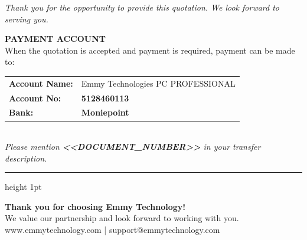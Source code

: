 \documentclass[11pt, a4paper]{article}
\begin{document}
\vspace{6mm}

\begin{flushright}
    \begin{minipage}{0.65\textwidth}
        \raggedleft
        \small
        \textit{Thank you for the opportunity to provide this quotation. We look forward to serving you.}
    \end{minipage}
\end{flushright}

\vspace{4mm}

\noindent
\begin{minipage}[t]{0.65\textwidth}
    \textbf{\textcolor{brandblue}{PAYMENT ACCOUNT}} \\
    \vspace{1mm}
    \small When the quotation is accepted and payment is required, payment can be made to: \\
    \vspace{1mm}
    \begin{tabular}{|l l|}
        \hline
        \textbf{Account Name:} & Emmy Technologies PC PROFESSIONAL \\
        \textbf{Account No:} & \textbf{5128460113} \\
        \textbf{Bank:} & \textbf{Moniepoint} \\
        \hline
    \end{tabular} \\
    \vspace{2mm}
    \textit{\small Please mention \textbf{<<DOCUMENT_NUMBER>>} in your transfer description.}
\end{minipage}

\vfill

\begin{center}
    {\color{brandyellow}\hrule height 1pt}
    \vspace{2mm}
    \small
    \textbf{Thank you for choosing Emmy Technology!} \\
    We value our partnership and look forward to working with you. \\
    \vspace{1mm}
    \textcolor{brandblue}{www.emmytechnology.com} | \textcolor{brandblue}{support@emmytechnology.com}
\end{center}
\end{document}
